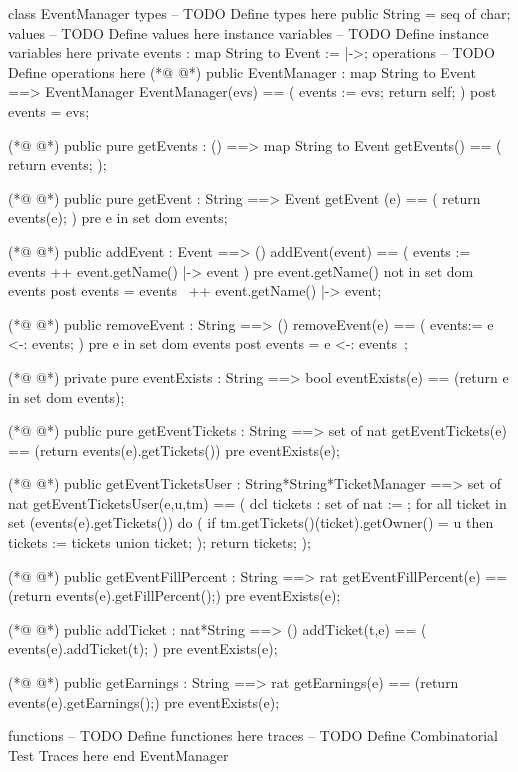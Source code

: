 \begin{vdmpp}[breaklines=true]
class EventManager
types
-- TODO Define types here
 public String = seq of char;
values
-- TODO Define values here
instance variables
-- TODO Define instance variables here
 private events : map String to Event := {|->};
operations
-- TODO Define operations here
(*@
\label{EventManager:12}
@*)
 public EventManager : map String to Event ==> EventManager
 EventManager(evs) == (
  events := evs;
  return self;
 )
 post events = evs;
 
(*@
\label{getEvents:19}
@*)
 public pure getEvents : () ==> map String to Event
 getEvents() == (
  return events;
 );
 
(*@
\label{getEvent:24}
@*)
 public pure getEvent : String ==> Event
 getEvent (e) == (
  return events(e);
 )
 pre e in set dom events;
 
(*@
\label{addEvent:30}
@*)
 public addEvent : Event ==> ()
 addEvent(event) == (
  events := events ++ {event.getName() |-> event}
 )
 pre event.getName() not in set dom events
 post events = events~ ++ {event.getName() |-> event};
 
(*@
\label{removeEvent:37}
@*)
 public removeEvent : String ==> ()
 removeEvent(e) == (
  events:= {e} <-: events; 
 )
 pre e in set dom events
 post events = {e} <-: events~; 
 
(*@
\label{eventExists:44}
@*)
 private pure eventExists : String ==> bool
 eventExists(e) == (return e in set dom events);
 
(*@
\label{getEventTickets:47}
@*)
 public pure getEventTickets : String ==> set of nat
 getEventTickets(e) == (return events(e).getTickets())
 pre eventExists(e);
 
(*@
\label{getEventTicketsUser:51}
@*)
 public getEventTicketsUser : String*String*TicketManager ==> set of nat
 getEventTicketsUser(e,u,tm) == (
  dcl tickets : set of nat := {};
  for all ticket in set (events(e).getTickets()) do 
  (
   if tm.getTickets()(ticket).getOwner() = u
    then tickets := tickets union {ticket};
  );
  return tickets;
 );
 
(*@
\label{getEventFillPercent:62}
@*)
 public getEventFillPercent : String ==> rat
 getEventFillPercent(e) == (return events(e).getFillPercent();)
 pre eventExists(e);
 
(*@
\label{addTicket:66}
@*)
 public addTicket : nat*String ==> ()
 addTicket(t,e) == (
  events(e).addTicket(t);
 )
 pre eventExists(e);
 
(*@
\label{getEarnings:72}
@*)
 public getEarnings : String ==> rat
 getEarnings(e) == (return events(e).getEarnings();)
 pre eventExists(e);
 

functions
-- TODO Define functiones here
traces
-- TODO Define Combinatorial Test Traces here
end EventManager
\end{vdmpp}
